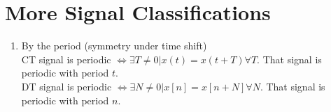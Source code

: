 \documentclass[nobib]{tufte-handout}
\begin{document}
\section{More Signal Classifications}
\begin{enumerate}[start = 3]
    \item By the period (symmetry under time shift)\\
    CT signal is periodic $\iff \exists T\neq 0 | x(t)=x(t+T) \forall T$. That signal is periodic with period $t$.\\
    DT signal is periodic $\iff \exists N\neq 0 | x[n]=x[n+N] \forall N$. That signal is periodic with period $n$.
\end{enumerate}
\end{document}
